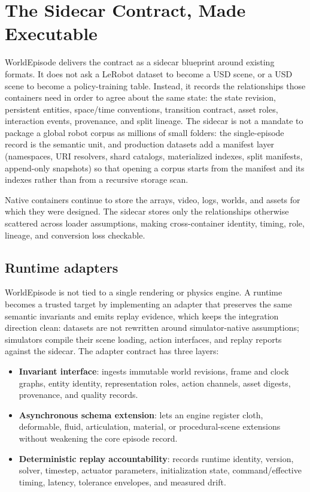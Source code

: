 \section{The Sidecar Contract, Made Executable}
\label{sec:contract}

WorldEpisode delivers the contract as a sidecar blueprint around existing formats. It does not ask
a LeRobot dataset to become a USD scene, or a USD scene to become a policy-training table. Instead, it records the relationships those
containers need in order to agree about the same state: the state revision, persistent entities,
space/time conventions, transition contract, asset roles, interaction events, provenance, and split
lineage. The sidecar is not a mandate to package a global robot corpus as millions of small
folders: the single-episode record is the semantic unit, and production datasets add a manifest
layer (namespaces, URI resolvers, shard catalogs, materialized indexes, split manifests,
append-only snapshots) so that opening a corpus starts from the manifest and its indexes rather
than from a recursive storage scan.

Native containers continue to store the arrays, video, logs, worlds, and assets for which they were
designed. The sidecar stores only the relationships otherwise scattered across loader assumptions,
making cross-container identity, timing, role, lineage, and conversion loss checkable.

\subsection{Runtime adapters}

WorldEpisode is not tied to a single rendering or physics engine. A runtime becomes a trusted
target by implementing an adapter that preserves the same semantic invariants and emits replay
evidence, which keeps the integration direction clean: datasets are not rewritten around
simulator-native assumptions; simulators compile their scene loading, action interfaces, and replay
reports against the sidecar. The adapter contract has three layers:
\begin{itemize}[leftmargin=1.4em,itemsep=2pt,topsep=3pt]
  \item \textbf{Invariant interface}: ingests immutable world revisions, frame and clock graphs,
  entity identity, representation roles, action channels, asset digests, provenance, and quality
  records.
  \item \textbf{Asynchronous schema extension}: lets an engine register cloth, deformable, fluid,
  articulation, material, or procedural-scene extensions without weakening the core episode record.
  \item \textbf{Deterministic replay accountability}: records runtime identity, version, solver,
  timestep, actuator parameters, initialization state, command/effective timing, latency, tolerance
  envelopes, and measured drift.
\end{itemize}

